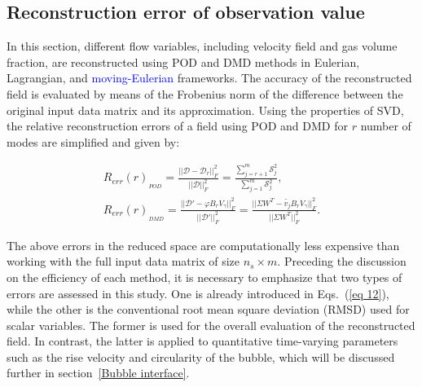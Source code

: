 \documentclass[a4paper,fleqn]{cas-sc}
\newcommand{\hl}[1]{\textcolor{blue}{#1}} %
\newcommand{\hl}[1]{#1} %
\begin{document}
	\subsection{Reconstruction error of observation value}
	\label{Reconstruction error analysis}
	In this section, different flow variables, including velocity field and gas volume fraction, are reconstructed using POD and DMD methods in Eulerian, Lagrangian, and \hl{moving-Eulerian} frameworks. The accuracy of the reconstructed field is evaluated by means of the Frobenius norm of the difference between the original input data matrix and its approximation. Using the properties of SVD, the relative reconstruction errors of a field using POD and DMD for $r$ number of modes are simplified and given by:
	
	\begin{subequations}\label{eq 12}
		\begin{align}
			R_{err}(r)_{_{POD}} = \frac{||\mathcal{D} - \mathcal{D}_r||_F^2}{||\mathcal{D}||_F^2} = \frac{\sum\limits_{j=r+1}^m \mathcal{S}_j^2}{\sum\limits_{j=1}^m\mathcal{S}_j^2}, \label{eq 12a} \\
			R_{err}(r)_{_{DMD}} = \frac{||\mathcal{D}' - \varphi B_r V_{\gamma}||_F^2}{||\mathcal{D}'||_F^2} = \frac{||\Sigma W^T-\tilde{v_j} B_r V_{\gamma}||_F^2}{||\Sigma W^T||_F^2}.\label{eq 12b}
		\end{align}
	\end{subequations}
	
	\noindent The above errors in the reduced space are computationally less expensive than working with the full input data matrix of size $n_s \times m$. Preceding the discussion on the efficiency of each method, it is necessary to emphasize that two types of errors are assessed in this study. One is already introduced in Eqs.~(\ref{eq 12}), while the other is the conventional root mean square deviation (RMSD) used for scalar variables. The former is used for the overall evaluation of the reconstructed field. In contrast, the latter is applied to quantitative time-varying parameters such as the rise velocity and circularity of the bubble, which will be discussed further in section~\ref{Bubble interface}.
	
\end{document}
